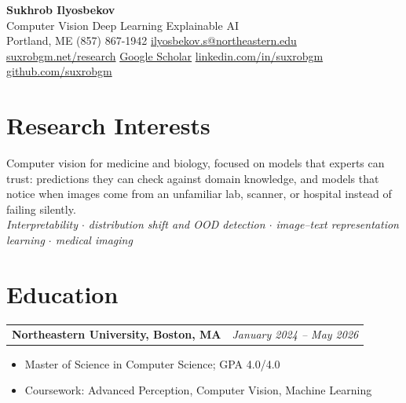 \documentclass[letterpaper,11pt]{article}
\makeatletter
\newcommand{\educationEntry}[2]{%
    \vspace{1pt}\noindent
    \begin{tabular*}{\textwidth}{@{}l@{\extracolsep{\fill}}r@{}}
        \textbf{\color{accent}#1} & \textit{\color{lighttext}#2} \\
    \end{tabular*}\vspace{-3pt}
}
\makeatother
\begin{document}
\begin{center}
    {\Huge\bfseries\color{darktext} Sukhrob Ilyosbekov}\vspace{4pt}\\
    {\large\color{accent} Computer Vision \enspace\textperiodcentered\enspace Deep Learning \enspace\textperiodcentered\enspace Explainable AI}\vspace{8pt}\\
    {\color{lighttext}
    \faMapMarker*\enspace Portland, ME \quad
    \faPhone\enspace(857) 867-1942 \quad
    \faEnvelope\enspace\href{mailto:ilyosbekov.s@northeastern.edu}{ilyosbekov.s@northeastern.edu}
    }\vspace{3pt}\\
    {\color{lighttext}
    \faGlobe\enspace\href{https://suxrobgm.net/research}{suxrobgm.net/research} \quad
    \faGraduationCap\enspace\href{https://scholar.google.com/citations?user=p7ujRHoAAAAJ}{Google Scholar} \quad
    \faLinkedin\enspace\href{https://www.linkedin.com/in/suxrobgm}{linkedin.com/in/suxrobgm} \quad
    \faGithub\enspace\href{https://github.com/suxrobgm}{github.com/suxrobgm}
    }
\end{center}

\section{Research Interests}
Computer vision for medicine and biology, focused on models that experts can trust: predictions they can check against domain knowledge, and models that notice when images come from an unfamiliar lab, scanner, or hospital instead of failing silently.\\[2pt]
{\color{lighttext}\textit{Interpretability $\cdot$ distribution shift and OOD detection $\cdot$ image--text representation learning $\cdot$ medical imaging}}

\section{Education}

\educationEntry{Northeastern University, Boston, MA}{January 2024 -- May 2026}
\begin{itemize}
    \item Master of Science in Computer Science; GPA 4.0/4.0
    \item Coursework: Advanced Perception, Computer Vision, Machine Learning
\end{itemize}
\end{document}
